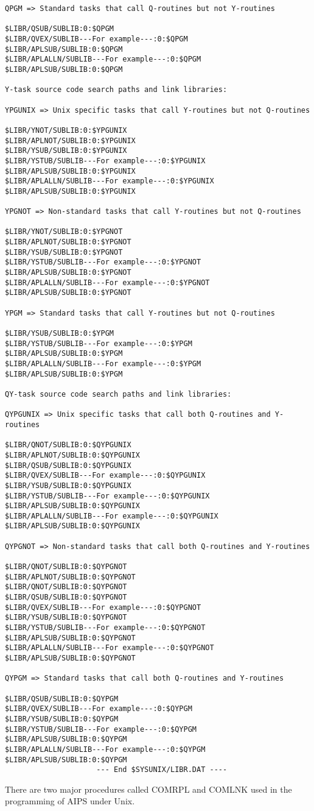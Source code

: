 \begin{verbatim}
QPGM => Standard tasks that call Q-routines but not Y-routines

$LIBR/QSUB/SUBLIB:0:$QPGM
$LIBR/QVEX/SUBLIB---For example---:0:$QPGM
$LIBR/APLSUB/SUBLIB:0:$QPGM
$LIBR/APLALLN/SUBLIB---For example---:0:$QPGM
$LIBR/APLSUB/SUBLIB:0:$QPGM

Y-task source code search paths and link libraries:

YPGUNIX => Unix specific tasks that call Y-routines but not Q-routines

$LIBR/YNOT/SUBLIB:0:$YPGUNIX
$LIBR/APLNOT/SUBLIB:0:$YPGUNIX
$LIBR/YSUB/SUBLIB:0:$YPGUNIX
$LIBR/YSTUB/SUBLIB---For example---:0:$YPGUNIX
$LIBR/APLSUB/SUBLIB:0:$YPGUNIX
$LIBR/APLALLN/SUBLIB---For example---:0:$YPGUNIX
$LIBR/APLSUB/SUBLIB:0:$YPGUNIX

YPGNOT => Non-standard tasks that call Y-routines but not Q-routines

$LIBR/YNOT/SUBLIB:0:$YPGNOT
$LIBR/APLNOT/SUBLIB:0:$YPGNOT
$LIBR/YSUB/SUBLIB:0:$YPGNOT
$LIBR/YSTUB/SUBLIB---For example---:0:$YPGNOT
$LIBR/APLSUB/SUBLIB:0:$YPGNOT
$LIBR/APLALLN/SUBLIB---For example---:0:$YPGNOT
$LIBR/APLSUB/SUBLIB:0:$YPGNOT

YPGM => Standard tasks that call Y-routines but not Q-routines

$LIBR/YSUB/SUBLIB:0:$YPGM
$LIBR/YSTUB/SUBLIB---For example---:0:$YPGM
$LIBR/APLSUB/SUBLIB:0:$YPGM
$LIBR/APLALLN/SUBLIB---For example---:0:$YPGM
$LIBR/APLSUB/SUBLIB:0:$YPGM

QY-task source code search paths and link libraries:

QYPGUNIX => Unix specific tasks that call both Q-routines and Y-routines

$LIBR/QNOT/SUBLIB:0:$QYPGUNIX
$LIBR/APLNOT/SUBLIB:0:$QYPGUNIX
$LIBR/QSUB/SUBLIB:0:$QYPGUNIX
$LIBR/QVEX/SUBLIB---For example---:0:$QYPGUNIX
$LIBR/YSUB/SUBLIB:0:$QYPGUNIX
$LIBR/YSTUB/SUBLIB---For example---:0:$QYPGUNIX
$LIBR/APLSUB/SUBLIB:0:$QYPGUNIX
$LIBR/APLALLN/SUBLIB---For example---:0:$QYPGUNIX
$LIBR/APLSUB/SUBLIB:0:$QYPGUNIX

QYPGNOT => Non-standard tasks that call both Q-routines and Y-routines

$LIBR/QNOT/SUBLIB:0:$QYPGNOT
$LIBR/APLNOT/SUBLIB:0:$QYPGNOT
$LIBR/QNOT/SUBLIB:0:$QYPGNOT
$LIBR/QSUB/SUBLIB:0:$QYPGNOT
$LIBR/QVEX/SUBLIB---For example---:0:$QYPGNOT
$LIBR/YSUB/SUBLIB:0:$QYPGNOT
$LIBR/YSTUB/SUBLIB---For example---:0:$QYPGNOT
$LIBR/APLSUB/SUBLIB:0:$QYPGNOT
$LIBR/APLALLN/SUBLIB---For example---:0:$QYPGNOT
$LIBR/APLSUB/SUBLIB:0:$QYPGNOT

QYPGM => Standard tasks that call both Q-routines and Y-routines

$LIBR/QSUB/SUBLIB:0:$QYPGM
$LIBR/QVEX/SUBLIB---For example---:0:$QYPGM
$LIBR/YSUB/SUBLIB:0:$QYPGM
$LIBR/YSTUB/SUBLIB---For example---:0:$QYPGM
$LIBR/APLSUB/SUBLIB:0:$QYPGM
$LIBR/APLALLN/SUBLIB---For example---:0:$QYPGM
$LIBR/APLSUB/SUBLIB:0:$QYPGM
                     --- End $SYSUNIX/LIBR.DAT ----

\end{verbatim}
There are two major procedures called COMRPL and COMLNK used in the
programming of AIPS under Unix.

